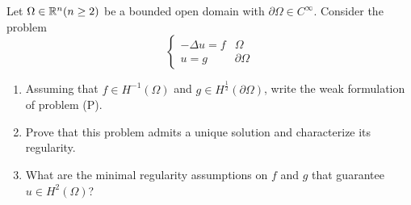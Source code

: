 \newpage
\begin{exercise}
    Let \(\Omega \in \mathbb{R}^n (n \geq 2)\) be a bounded open domain with \(\partial\Omega \in C^\infty\). Consider the problem
    \[
        \begin{cases}
            -\Delta u = f & \Omega \\
            u = g & \partial\Omega
        \end{cases}
        \tag*{(P)}
    \]
    \begin{enumerate}
        \item Assuming that \(f \in H^{-1}(\Omega)\) and \(g \in H^{\frac{1}{2}}(\partial\Omega)\), write the weak formulation of problem (P).
        \item Prove that this problem admits a unique solution and characterize its regularity.
        \item What are the minimal regularity assumptions on \(f\) and \(g\) that guarantee \(u \in H^2(\Omega)\)?
    \end{enumerate}
\end{exercise}
